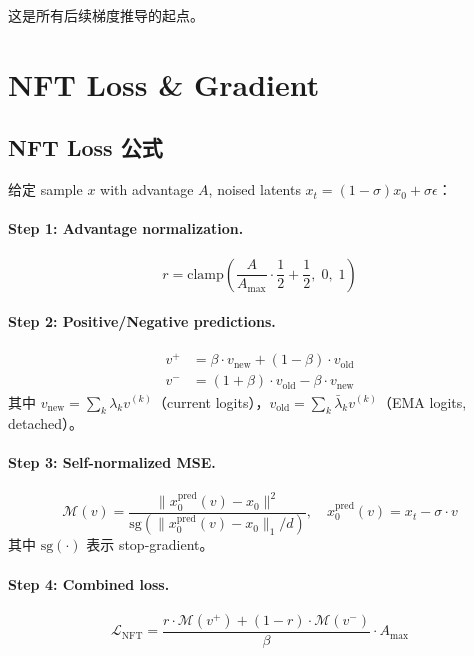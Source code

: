 \documentclass[11pt,a4paper]{article}
\newcommand{\loss}{\mathcal{L}}
\newcommand{\sg}{\mathrm{sg}}
\theoremstyle{definition}
\begin{document}
这是所有后续梯度推导的起点。

\section{NFT Loss \& Gradient}
\label{sec:nft}

\subsection{NFT Loss 公式}

给定 sample $x$ with advantage $A$, noised latents $x_t = (1-\sigma)x_0 + \sigma \epsilon$：

\paragraph{Step 1: Advantage normalization.}
\begin{equation}
r = \mathrm{clamp}\!\left(\frac{A}{A_{\max}} \cdot \frac{1}{2} + \frac{1}{2},\; 0,\; 1\right)
\end{equation}

\paragraph{Step 2: Positive/Negative predictions.}
\begin{align}
v^+ &= \beta \cdot v_{\mathrm{new}} + (1-\beta) \cdot v_{\mathrm{old}} \\
v^- &= (1+\beta) \cdot v_{\mathrm{old}} - \beta \cdot v_{\mathrm{new}}
\end{align}
其中 $v_{\mathrm{new}} = \sum_k \lambda_k v^{(k)}$（current logits），$v_{\mathrm{old}} = \sum_k \bar\lambda_k v^{(k)}$（EMA logits, detached）。

\paragraph{Step 3: Self-normalized MSE.}
\begin{equation}
\mathcal{M}(v) = \frac{\|x_0^{\mathrm{pred}}(v) - x_0\|^2}{\sg\!\left(\|x_0^{\mathrm{pred}}(v) - x_0\|_1 / d\right)}, \quad x_0^{\mathrm{pred}}(v) = x_t - \sigma \cdot v
\end{equation}
其中 $\sg(\cdot)$ 表示 stop-gradient。

\paragraph{Step 4: Combined loss.}
\begin{equation}
\boxed{
\loss_{\mathrm{NFT}} = \frac{r \cdot \mathcal{M}(v^+) + (1-r) \cdot \mathcal{M}(v^-)}{\beta} \cdot A_{\max}
}
\label{eq:nft_loss}
\end{equation}
\end{document}
